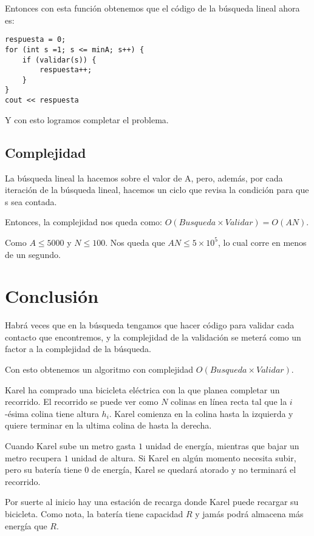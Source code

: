 Entonces con esta función obtenemos que el código de la búsqueda lineal ahora es:
\begin{lstlisting}
respuesta = 0;
for (int s =1; s <= minA; s++) {
	if (validar(s)) {
		respuesta++;
	}
}
cout << respuesta

\end{lstlisting}

Y con esto logramos completar el problema.

\subsection*{Complejidad}
La búsqueda lineal la hacemos sobre el valor de A, pero, además, por cada iteración de la búsqueda lineal, hacemos un ciclo que revisa la condición para que s sea contada.

Entonces, la complejidad nos queda como:   \(O(Busqueda\times Validar)=O(AN)\).

Como \(A\leq 5000\) y \(N\leq 100\). Nos queda que \(AN\leq 5\times 10^5\), lo cual corre en menos de un segundo.

\section*{Conclusión}
Habrá veces que en la búsqueda tengamos que hacer código para validar cada contacto que encontremos, y la complejidad de la validación se meterá como un factor a la complejidad de la búsqueda.  

Con esto obtenemos un algoritmo con complejidad \(O(Busqueda\times Validar)\).
\newpage

\practiceproblemregion
\label{bicicleta}
\problemtitle  Karel ha comprado una bicicleta eléctrica con la que planea completar un recorrido. El recorrido se puede ver como \(N\) colinas en línea recta tal que la \(i\)-ésima colina tiene altura \(h_i\). Karel comienza en la colina hasta la izquierda y quiere terminar en la ultima colina de hasta la derecha.

Cuando Karel sube un metro gasta \(1\) unidad de energía, mientras que bajar un metro recupera \(1\) unidad de altura. Si Karel en algún momento necesita subir, pero su batería tiene 0 de energía, Karel se quedará atorado y no terminará el recorrido.

Por suerte al inicio hay una estación de recarga donde Karel puede recargar su bicicleta. Como nota, la batería tiene capacidad \(R\) y jamás podrá almacena más energía que \(R\).

